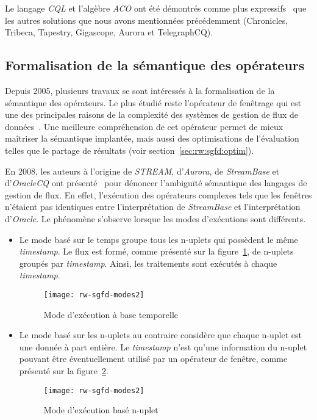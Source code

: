 Le langage \textit{CQL} et l'algèbre \textit{ACO} ont été démontrés comme plus expressifs~\cite{Arasu:cql} que les autres solutions que nous avons mentionnées précédemment (Chronicles, Tribeca, Tapestry, Gigascope, Aurora et TelegraphCQ).

\subsection{Formalisation de la sémantique des opérateurs}\label{sec:rw:sgfd:modeles:batch}
Depuis 2005, plusieurs travaux se sont intéressés à la formalisation de la sémantique des opérateurs. Le plus étudié reste l'opérateur de fenêtrage qui est une des principales raisons de la complexité des systèmes de gestion de flux de données~\cite{Maier:semantics,Patroumpas:window,Patroumpas:subsumewindows}. Une meilleure compréhension de cet opérateur permet de mieux maîtriser la sémantique implantée, mais aussi des optimisations de l'évaluation telles que le partage de résultats (voir section~\ref{sec:rw:sgfd:optim}).

En 2008, les auteurs à l'origine de \textit{STREAM}, d'\textit{Aurora}, de \textit{StreamBase} et d'\textit{OracleCQ} ont présenté~\cite{Jain:spread} pour dénoncer l'ambiguïté sémantique des langages de gestion de flux. En effet, l'exécution des opérateurs complexes tels que les fenêtres n'étaient pas identiques entre l'interprétation de \textit{StreamBase} et l'interprétation d'\textit{Oracle}. Le phénomène s'observe lorsque les modes d'exécutions sont différents.
\begin{itemize}
	\item Le mode basé sur le temps groupe tous les n-uplets qui possèdent le même \textit{timestamp}. Le flux est formé, comme présenté sur la figure~\ref{fig:rw:sgfd:mode:time}, de n-uplets groupés par \textit{timestamp}. Ainsi, les traitements sont exécutés à chaque \textit{timestamp}.
	\begin{figure}[ht]
		\centering
		\texttt{[image: rw-sgfd-modes2]}
		\caption{Mode d'exécution à base temporelle}\label{fig:rw:sgfd:mode:time}
	\end{figure}
	\item Le mode basé sur les n-uplets au contraire considère que chaque n-uplet est une donnée à part entière. Le \textit{timestamp} n'est qu'une information du n-uplet pouvant être éventuellement utilisé par un opérateur de fenêtre, comme présenté sur la figure~\ref{fig:rw:sgfd:mode:tuple}.
	\begin{figure}[ht]
		\centering
		\texttt{[image: rw-sgfd-modes2]}
		\caption{Mode d'exécution basé n-uplet}\label{fig:rw:sgfd:mode:tuple}
	\end{figure}
\end{itemize}

